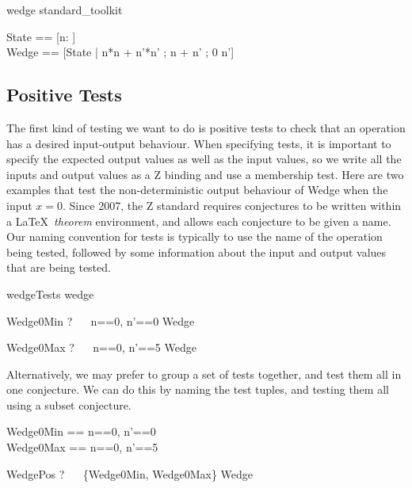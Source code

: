 \documentclass{llncs}
\begin{document}
\begin{zsection}
  \SECTION wedge \parents standard\_toolkit
\end{zsection}
\begin{zed}
  State == [n:  ] \\
  Wedge == [\Delta State | n*n + n'*n' ; n + n' ; 0 \leq n']
\end{zed}

\subsection{Positive Tests}

The first kind of testing we want to do is positive tests to check that an
operation has a desired input-output behaviour.  When specifying
tests, it is important to specify the expected output values as well as the
input values, so we write all the inputs and output values as a Z binding
and use a membership test.  Here are two examples that test the
non-deterministic output behaviour of Wedge when the input $x=0$.
Since 2007, the Z standard requires conjectures to be written within
a \LaTeX\ \emph{theorem} environment, and allows each conjecture to be
given a name.  Our naming convention for tests is typically to use the name
of the operation being tested, followed by some information about the input
and output values that are being tested.

\begin{zsection}
  \SECTION wedgeTests \parents wedge
\end{zsection}

\begin{theorem}{Wedge0Min}
\vdash? ~~ \lblot n==0, n'==0 \rblot \in Wedge
\end{theorem}

\begin{theorem}{Wedge0Max}
\vdash? ~~ \lblot n==0, n'==5 \rblot \in Wedge
\end{theorem}

Alternatively, we may prefer to group a set of tests together, and test
them all in one conjecture.  We can do this by naming the test tuples, and
testing them all using a subset conjecture.

\begin{zed}
  Wedge0Min == \lblot n==0, n'==0 \rblot \\
  Wedge0Max == \lblot n==0, n'==5 \rblot
\end{zed}

\begin{theorem}{WedgePos}
  \vdash? ~~ \{Wedge0Min, Wedge0Max\} \subseteq Wedge
\end{theorem}
\end{document}
